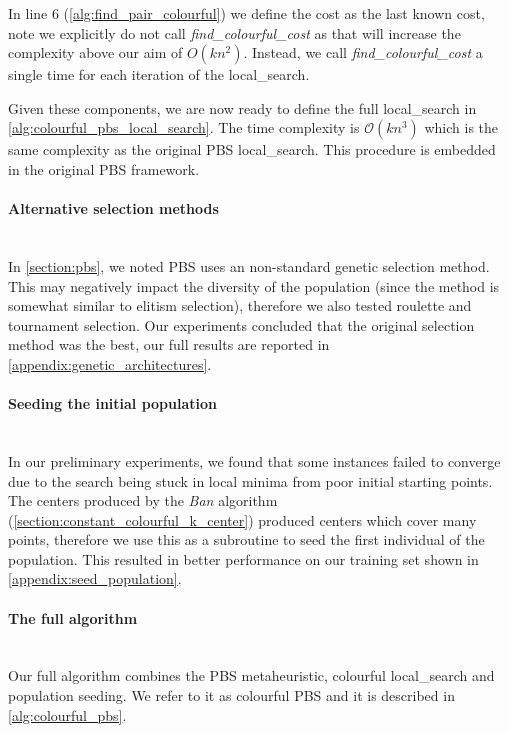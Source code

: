 

In line 6 (\cref{alg:find_pair_colourful}) we define the cost as the last known cost, note we explicitly do not call \emph{find\_colourful\_cost} as that will increase the complexity above our aim of ${O}(kn^2)$. Instead, we call \emph{find\_colourful\_cost} a single time for each iteration of the \gls{local_search}.

Given these components, we are now ready to define the full \gls{local_search} in \cref{alg:colourful_pbs_local_search}. The time complexity is $\mathcal{O}(kn^3)$ which is the same complexity as the original PBS \gls{local_search}. This procedure is embedded in the original PBS framework.



\paragraph{Alternative selection methods}~\\
In \cref{section:pbs}, we noted PBS uses an non-standard genetic selection method. This may negatively impact the diversity of the population (since the method is somewhat similar to elitism selection), therefore we also tested roulette and tournament selection. Our experiments concluded that the original selection method was the best, our full results are reported in \cref{appendix:genetic_architectures}.

\paragraph{Seeding the initial population}~\\
In our preliminary experiments, we found that some instances failed to converge due to the search being stuck in local minima from poor initial starting points. The centers produced by the \emph{Ban} algorithm (\cref{section:constant_colourful_k_center}) produced centers which cover many points, therefore we use this as a subroutine to seed the first individual of the population. This resulted in better performance on our training set shown in \cref{appendix:seed_population}.

\paragraph{The full algorithm}~\\
Our full algorithm combines the PBS metaheuristic, colourful \gls{local_search} and population seeding. We refer to it as colourful PBS and it is described in \cref{alg:colourful_pbs}.

